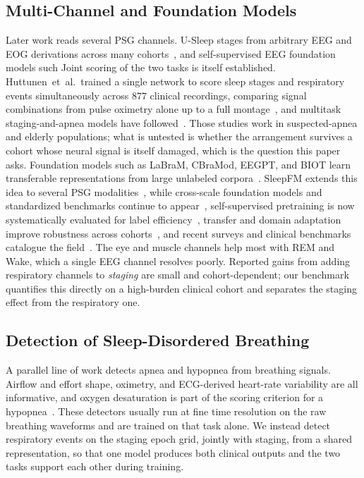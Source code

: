\documentclass{ieeeaccess}
\begin{document}
\subsection{Multi-Channel and Foundation Models}
Later work reads several PSG channels. U-Sleep stages from arbitrary EEG and EOG derivations
across many cohorts~\cite{perslev2021usleep}, and self-supervised EEG foundation models such
Joint scoring of the two tasks is itself established. Huttunen~et~al.\ trained a single network to score sleep stages and respiratory events
simultaneously across $877$ clinical recordings, comparing signal combinations from
pulse oximetry alone up to a full montage~\cite{huttunen2023simultaneous}, and multitask
staging-and-apnea models have followed~\cite{multitask2025elderly}. Those studies work in
suspected-apnea and elderly populations; what is untested is whether the arrangement
survives a cohort whose neural signal is itself damaged, which is the question this paper
asks. Foundation models such
as LaBraM, CBraMod, EEGPT, and BIOT learn transferable representations from large unlabeled
corpora~\cite{labram2024,cbramod2025,eegpt2024,biot2023}. SleepFM extends this idea to several
PSG modalities~\cite{sleepfm2026}, while cross-scale foundation models and standardized
benchmarks continue to appear~\cite{csbrain2025,neuroatlas2026,sleepyland2026}, self-supervised
pretraining is now systematically evaluated for label efficiency~\cite{estevan2025ssl}, transfer
and domain adaptation improve robustness across cohorts~\cite{guillot2023transfer}, and recent
surveys and clinical benchmarks catalogue the field~\cite{yang2026review,hanif2025insomnia}. The eye and muscle channels help most with REM and Wake,
which a single EEG channel resolves poorly. Reported gains from adding respiratory channels to
\emph{staging} are small and cohort-dependent; our benchmark quantifies this directly on a
high-burden clinical cohort and separates the staging effect from the respiratory one.

\subsection{Detection of Sleep-Disordered Breathing}
A parallel line of work detects apnea and hypopnea from breathing signals. Airflow and effort
shape, oximetry, and ECG-derived heart-rate variability are all informative, and oxygen
desaturation is part of the scoring criterion for a
hypopnea~\cite{aasm2023manual}. These detectors usually run
at fine time resolution on the raw breathing waveforms and are trained on that task alone. We
instead detect respiratory events on the staging epoch grid, jointly with staging, from a
shared representation, so that one model produces both clinical outputs and the two tasks
support each other during training.
\end{document}
